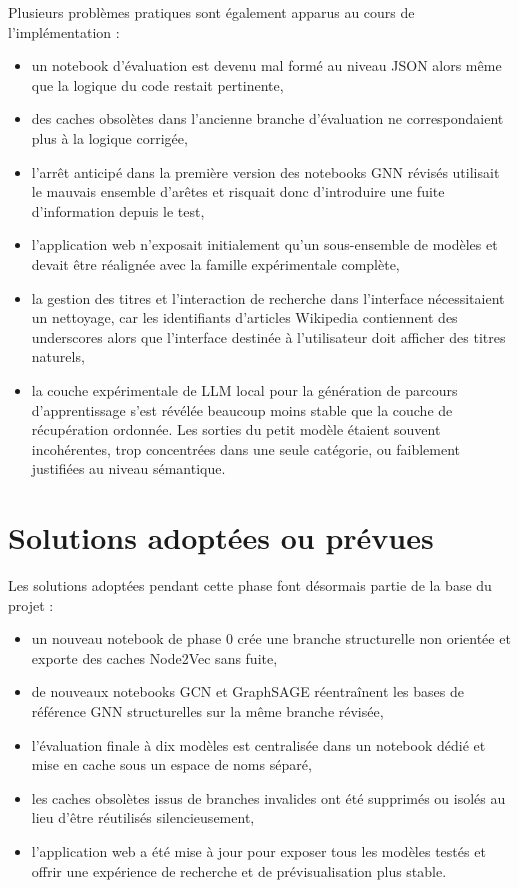 Plusieurs problèmes pratiques sont également apparus au cours de
l'implémentation :
\begin{itemize}
    \item un notebook d'évaluation est devenu mal formé au niveau JSON alors
    même que la logique du code restait pertinente,
    \item des caches obsolètes dans l'ancienne branche d'évaluation ne
    correspondaient plus à la logique corrigée,
    \item l'arrêt anticipé dans la première version des notebooks GNN révisés
    utilisait le mauvais ensemble d'arêtes et risquait donc d'introduire une
    fuite d'information depuis le test,
    \item l'application web n'exposait initialement qu'un sous-ensemble de
    modèles et devait être réalignée avec la famille expérimentale complète,
    \item la gestion des titres et l'interaction de recherche dans l'interface
    nécessitaient un nettoyage, car les identifiants d'articles Wikipedia
    contiennent des underscores alors que l'interface destinée à l'utilisateur
    doit afficher des titres naturels,
    \item la couche expérimentale de LLM local pour la génération de parcours
    d'apprentissage s'est révélée beaucoup moins stable que la couche de
    récupération ordonnée. Les sorties du petit modèle étaient souvent
    incohérentes, trop concentrées dans une seule catégorie, ou faiblement
    justifiées au niveau sémantique.
\end{itemize}

\section{Solutions adoptées ou prévues}

Les solutions adoptées pendant cette phase font désormais partie de la base du
projet :
\begin{itemize}
    \item un nouveau notebook de phase 0 crée une branche structurelle non
    orientée et exporte des caches Node2Vec sans fuite,
    \item de nouveaux notebooks GCN et GraphSAGE réentraînent les bases de
    référence GNN structurelles sur la même branche révisée,
    \item l'évaluation finale à dix modèles est centralisée dans un notebook
    dédié et mise en cache sous un espace de noms séparé,
    \item les caches obsolètes issus de branches invalides ont été supprimés ou
    isolés au lieu d'être réutilisés silencieusement,
    \item l'application web a été mise à jour pour exposer tous les modèles
    testés et offrir une expérience de recherche et de prévisualisation plus
    stable.
\end{itemize}

